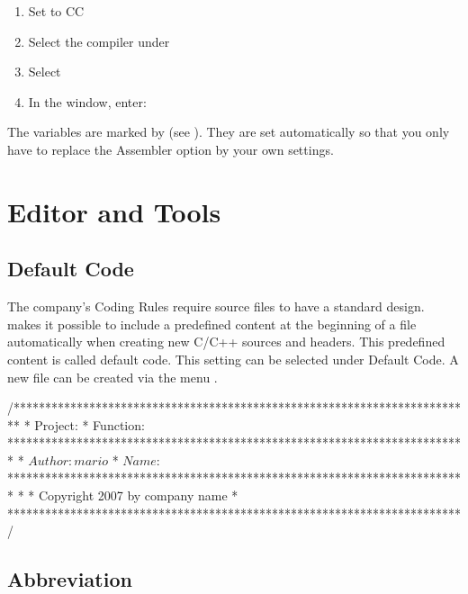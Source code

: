 \begin{enumerate}
\item Set  to CC
\item Select the compiler under 
\item Select 
\item In the window, enter:
\end{enumerate}

The \codeblocks variables are marked by \codeline{$} (see ). They are set automatically so that you only have to replace the Assembler option  by your own settings.

\section{Editor and Tools}

\subsection{Default Code}

The company's Coding Rules require source files to have a standard design. \codeblocks makes it possible to include a predefined content at the beginning of a file automatically when creating new C/C++ sources and headers. This predefined content is called default code. This setting can be selected under  Default Code. A new file can be created via the menu .


\begin{code}
/*************************************************************************
 *  Project:
 *  Function:
 *************************************************************************
 *  $Author: mario $
 *  $Name:  $
 *************************************************************************
 *
 *  Copyright 2007 by company name
 *
 ************************************************************************/
\end{code}

\subsection{Abbreviation}\label{sec:abbreviation}

